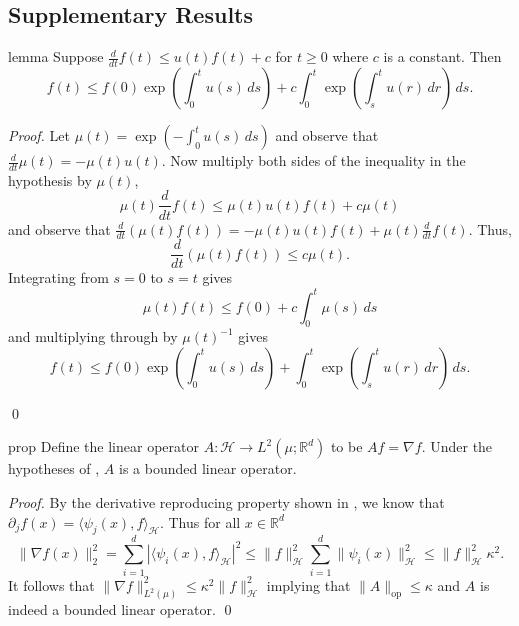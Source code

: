 \documentclass[11pt]{article}
\begin{document}


\subsection{Supplementary Results}

\begin{restatable}{lemma}{} \label{gronwall}
    Suppose $\frac{d}{dt}f(t) \leq u(t)f(t) + c$ for $t \geq 0$ where $c$ is a constant. Then 
    \[f(t) \leq f(0)\exp\left(\int_0^t u(s)\,ds\right) + c\int_0^t\exp \left(\int_s^tu(r)\,dr\right)\,ds.\]
\end{restatable}
\noindent \textit{Proof.} Let $\mu(t) = \exp(-\int_0^t u(s)\,ds)$ and observe that $\frac{d}{dt}\mu(t) = -\mu(t) u(t).$ Now multiply both sides of the inequality in the hypothesis by $\mu(t)$,
\[\mu(t)\frac{d}{dt}f(t) \leq \mu(t)u(t)f(t) + c\mu(t)\]
and observe that $\frac{d}{dt}(\mu(t)f(t)) = -\mu(t)u(t)f(t) + \mu(t)\frac{d}{dt}f(t).$ Thus,
\[\frac{d}{dt}\left(\mu(t)f(t)\right) \leq c\mu(t).\]
Integrating from $s = 0$ to $s = t$ gives
\[\mu(t)f(t) \leq f(0) + c\int_0^t \mu(s) \, ds \]
and multiplying through by $\mu(t)^{-1}$ gives
\[f(t) \leq f(0)\exp\left(\int_0^tu(s)\, ds\right) + \int_0^t\exp\left(\int_s^t u(r)\,dr\right)\,ds.\]

\qed{}


\begin{restatable}{prop}{} \label{bounded linear operator}
    Define the linear operator $A: \mathcal{H} \rightarrow L^2(\mu; \mathbb{R}^d)$ to be $Af = \nabla f$. Under the hypotheses of , $A$ is a bounded linear operator. 
\end{restatable}
\noindent \textit{Proof.} By the derivative reproducing property shown in , we know that $\partial_{j}f(x) = \langle \psi_j(x), f \rangle_{\mathcal{H}}$. Thus for all $x \in \mathbb{R}^d$
\[\|\nabla f(x)\|_2^2 = \sum_{i = 1}^d|\langle \psi_i(x), f\rangle_{\mathcal{H}}|^2 \leq \|f\|_{\mathcal{H}}^2\sum_{i = 1}^d\|\psi_i(x)\|_{\mathcal{H}}^2 \leq \|f\|_{\mathcal{H}}^2\kappa^2.\]
It follows that $\|\nabla f\|_{L^2(\mu)}^2 \leq \kappa^2 \|f\|_{\mathcal{H}}^2$ implying that $\|A\|_{\text{op}} \leq \kappa$ and $A$ is indeed a bounded linear operator. \qed{}
\end{document}
